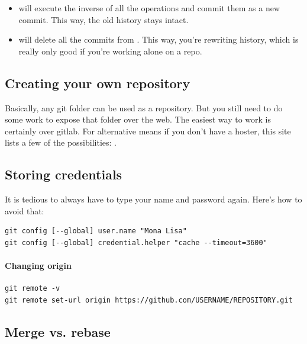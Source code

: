 \begin{itemize}
    \item {} will execute the inverse of all the operations and commit them as a new commit. This way, the old history stays intact.
    \item {} will delete all the commits from . This way, you're rewriting history, which is really only good if you're working alone on a repo.
\end{itemize}



\subsection{Creating your own repository}
Basically, any git folder can be used as a repository. But you still need to do some work to expose that folder over the web. The easiest way to work is certainly over gitlab. For alternative means if you don't have a hoster, this site lists a few of the possibilities: .



\subsection{Storing credentials}
It is tedious to always have to type your name and password again. Here's how to avoid that: 
\begin{lstlisting}
git config [--global] user.name "Mona Lisa"
git config [--global] credential.helper "cache --timeout=3600"
\end{lstlisting}

\paragraph{Changing origin}
\begin{lstlisting}
git remote -v
git remote set-url origin https://github.com/USERNAME/REPOSITORY.git
\end{lstlisting}


\subsection{Merge vs. rebase}

